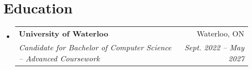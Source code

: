 \documentclass[letterpaper,11pt]{article}
\makeatletter
\newcommand{\resumeSubheading}[4]{
  \vspace{-2pt}\item
    \begin{tabular*}{0.97\textwidth}[t]{l@{\extracolsep{\fill}}r}
      \textbf{#1} & #2 \\
      \textit{\small#3} & \textit{\small #4} \\
    \end{tabular*}\vspace{-7pt}
}
\newcommand{\resumeSubHeadingListStart}{\begin{itemize}[leftmargin=0.15in, label={}]}
\newcommand{\resumeSubHeadingListEnd}{\end{itemize}}
\makeatother
\begin{document}
\section{Education}
  \resumeSubHeadingListStart
    \resumeSubheading
      {University of Waterloo}{Waterloo, ON}
      {Candidate for Bachelor of Computer Science -- Advanced Coursework}{Sept. 2022 -- May 2027}
  \resumeSubHeadingListEnd
\end{document}
